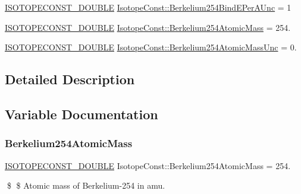 \begin{DoxyCompactItemize}
\mbox{\hyperlink{group___isotope_const-_macros_ga8f45a7272ce02c0b4c65c44636ed719a}{I\+S\+O\+T\+O\+P\+E\+C\+O\+N\+S\+T\+\_\+\+D\+O\+U\+B\+LE}} \mbox{\hyperlink{group___isotope_const-_berkelium-_bk254_ga8ddfa2fb918899686fee25a64fd2f707}{Isotope\+Const\+::\+Berkelium254\+Bind\+E\+Per\+A\+Unc}} = 1
\item 
\mbox{\hyperlink{group___isotope_const-_macros_ga8f45a7272ce02c0b4c65c44636ed719a}{I\+S\+O\+T\+O\+P\+E\+C\+O\+N\+S\+T\+\_\+\+D\+O\+U\+B\+LE}} \mbox{\hyperlink{group___isotope_const-_berkelium-_bk254_ga45c82458e4f2f64b0c173aeb4cdf5c66}{Isotope\+Const\+::\+Berkelium254\+Atomic\+Mass}} = 254.
\item 
\mbox{\hyperlink{group___isotope_const-_macros_ga8f45a7272ce02c0b4c65c44636ed719a}{I\+S\+O\+T\+O\+P\+E\+C\+O\+N\+S\+T\+\_\+\+D\+O\+U\+B\+LE}} \mbox{\hyperlink{group___isotope_const-_berkelium-_bk254_ga7db5f343c6b69617aa272cc64ef6cd35}{Isotope\+Const\+::\+Berkelium254\+Atomic\+Mass\+Unc}} = 0.
\end{DoxyCompactItemize}


\subsection{Detailed Description}


\subsection{Variable Documentation}
\mbox{\label{group___isotope_const-_berkelium-_bk254_ga45c82458e4f2f64b0c173aeb4cdf5c66}} 
\subsubsection{\texorpdfstring{Berkelium254\+Atomic\+Mass}{Berkelium254AtomicMass}}
{\footnotesize\ttfamily \mbox{\hyperlink{group___isotope_const-_macros_ga8f45a7272ce02c0b4c65c44636ed719a}{I\+S\+O\+T\+O\+P\+E\+C\+O\+N\+S\+T\+\_\+\+D\+O\+U\+B\+LE}} Isotope\+Const\+::\+Berkelium254\+Atomic\+Mass = 254.}

\$ \$ Atomic mass of Berkelium-\/254 in amu. \mbox{\label{group___isotope_const-_berkelium-_bk254_ga7db5f343c6b69617aa272cc64ef6cd35}} 

